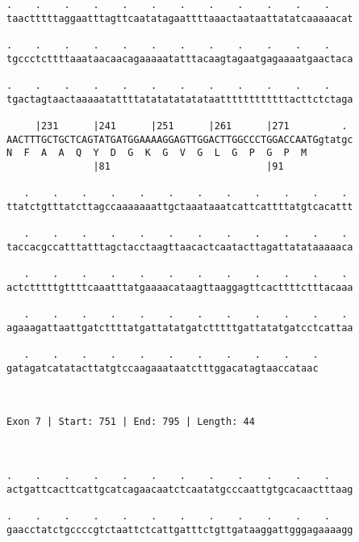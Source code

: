 \documentclass{article}
\begin{document}
\begin{Verbatim}
.    .    .    .    .    .    .    .    .    .    .    .    
taactttttaggaatttagttcaatatagaattttaaactaataattatatcaaaaacat
                                                            
.    .    .    .    .    .    .    .    .    .    .    .    
tgccctcttttaaataacaacagaaaaatatttacaagtagaatgagaaaatgaactaca
                                                            
.    .    .    .    .    .    .    .    .    .    .    .    
tgactagtaactaaaaatattttatatatatatataattttttttttttacttctctaga
                                                            
     |231      |241      |251      |261      |271         . 
AACTTTGCTGCTCAGTATGATGGAAAAGGAGTTGGACTTGGCCCTGGACCAATGgtatgc
N  F  A  A  Q  Y  D  G  K  G  V  G  L  G  P  G  P  M        
               |81                           |91            
  
   .    .    .    .    .    .    .    .    .    .    .    . 
ttatctgtttatcttagccaaaaaaattgctaaataaatcattcattttatgtcacattt
                                                            
   .    .    .    .    .    .    .    .    .    .    .    . 
taccacgccatttatttagctacctaagttaacactcaatacttagattatataaaaaca
                                                            
   .    .    .    .    .    .    .    .    .    .    .    . 
actctttttgttttcaaatttatgaaaacataagttaaggagttcacttttctttacaaa
                                                            
   .    .    .    .    .    .    .    .    .    .    .    . 
agaaagattaattgatcttttatgattatatgatctttttgattatatgatcctcattaa
                                                            
   .    .    .    .    .    .    .    .    .    .    .
gatagatcatatacttatgtccaagaaataatctttggacatagtaaccataac
                                                      
                                                      
 
Exon 7 | Start: 751 | End: 795 | Length: 44



.    .    .    .    .    .    .    .    .    .    .    .    
actgattcacttcattgcatcagaacaatctcaatatgcccaattgtgcacaactttaag
                                                            
.    .    .    .    .    .    .    .    .    .    .    .    
gaacctatctgccccgtctaattctcattgatttctgttgataaggattgggagaaaagg
                                                            

\end{Verbatim}
\end{document}
